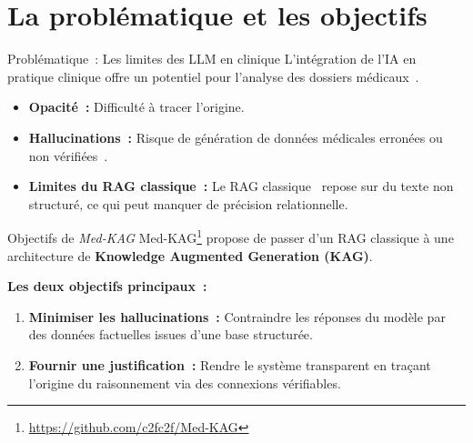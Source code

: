 \section{La problématique et les objectifs}

\begin{frame}{Problématique~: Les limites des LLM en clinique}
  L'intégration de l'IA en pratique clinique offre un potentiel pour l'analyse
  des dossiers médicaux~\cite{ALGHAMDI2025102528,
  zhou2024surveylargelanguagemodels}.

  \medskip{}

  \begin{itemize}
    \item<2-> \textbf{Opacité~:} Difficulté à tracer l'origine.
    \item<3-> \textbf{Hallucinations~:} Risque de génération de données
      médicales erronées ou non vérifiées~\cite{10.1145/3703155}.
    \item<4-> \textbf{Limites du RAG classique~:} Le RAG
      classique~\cite{gao2024modularragtransformingrag} repose sur du texte
      non structuré, ce qui peut manquer de précision relationnelle.
  \end{itemize}
\end{frame}

\begin{frame}{Objectifs de \emph{Med-KAG}}
  Med-KAG\footnote{\url{https://github.com/c2fc2f/Med-KAG}} propose de passer
  d'un RAG classique à une architecture de \textbf{Knowledge Augmented
  Generation (KAG)}.

  \medskip{}

  \pause[]

  \textbf{Les deux objectifs principaux~:}
  \begin{enumerate}
    \item<2-> \textbf{Minimiser les hallucinations~:} Contraindre les réponses
      du modèle par des données factuelles issues d'une base structurée.
    \item<3-> \textbf{Fournir une justification~:} Rendre le système
      transparent en traçant l'origine du raisonnement via des connexions
      vérifiables.
  \end{enumerate}
\end{frame}


